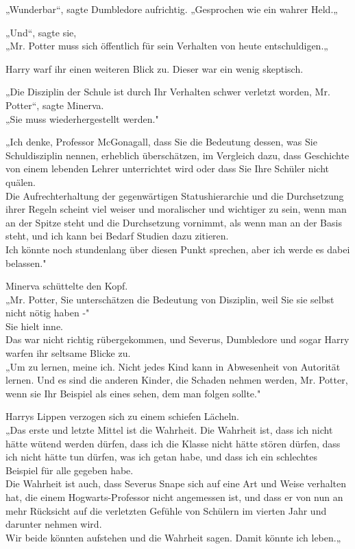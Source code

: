 {„Wunderbar“, sagte Dumbledore aufrichtig. „Gesprochen wie ein wahrer Held.„

„Und“, sagte sie,\\ „Mr. Potter muss sich öffentlich für sein Verhalten von heute entschuldigen.„

Harry warf ihr einen weiteren Blick zu. Dieser war ein wenig skeptisch.

„Die Disziplin der Schule ist durch Ihr Verhalten schwer verletzt worden, Mr. Potter“, sagte Minerva.\\ „Sie muss wiederhergestellt werden."

„Ich denke, Professor McGonagall, dass Sie die Bedeutung dessen, was Sie Schuldisziplin nennen, erheblich überschätzen, im Vergleich dazu, dass Geschichte von einem lebenden Lehrer unterrichtet wird oder dass Sie Ihre Schüler nicht quälen.\\ Die Aufrechterhaltung der gegenwärtigen Statushierarchie und die Durchsetzung ihrer Regeln scheint viel weiser und moralischer und wichtiger zu sein, wenn man an der Spitze steht und die Durchsetzung vornimmt, als wenn man an der Basis steht, und ich kann bei Bedarf Studien dazu zitieren.\\ Ich könnte noch stundenlang über diesen Punkt sprechen, aber ich werde es dabei belassen."

Minerva schüttelte den Kopf.\\ „Mr. Potter, Sie unterschätzen die Bedeutung von Disziplin, weil Sie sie selbst nicht nötig haben -"\\ Sie hielt inne.\\ Das war nicht richtig rübergekommen, und Severus, Dumbledore und sogar Harry warfen ihr seltsame Blicke zu.\\ „Um zu lernen, meine ich. Nicht jedes Kind kann in Abwesenheit von Autorität lernen. Und es sind die anderen Kinder, die Schaden nehmen werden, Mr. Potter, wenn sie Ihr Beispiel als eines sehen, dem man folgen sollte."

Harrys Lippen verzogen sich zu einem schiefen Lächeln.\\ „Das erste und letzte Mittel ist die Wahrheit. Die Wahrheit ist, dass ich nicht hätte wütend werden dürfen, dass ich die Klasse nicht hätte stören dürfen, dass ich nicht hätte tun dürfen, was ich getan habe, und dass ich ein schlechtes Beispiel für alle gegeben habe.\\ Die Wahrheit ist auch, dass Severus Snape sich auf eine Art und Weise verhalten hat, die einem Hogwarts-Professor nicht angemessen ist, und dass er von nun an mehr Rücksicht auf die verletzten Gefühle von Schülern im vierten Jahr und darunter nehmen wird.\\ Wir beide könnten aufstehen und die Wahrheit sagen. Damit könnte ich leben.„

}

